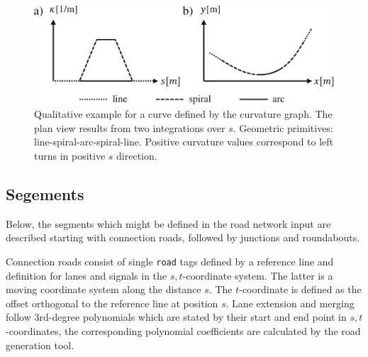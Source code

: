 \documentclass[a4paper, 10pt, conference]{ieeeconf}      %
\begin{document}
\begin{figure}%
	\centering
	\includegraphics{fig/curvGraph.pdf}
	\caption{Qualitative example for a curve defined by the curvature graph. The plan view results from two integrations over $s$. Geometric primitives: line-spiral-arc-spiral-line. Positive curvature values correspond to left turns in positive $s$ direction.}
	\label{fig_curvGraph}
\end{figure}

\subsection{Segements}\label{sec_segments}
Below, the segments which might be defined in the road network input are described starting with connection roads, followed by junctions and roundabouts.

Connection roads consist of single \texttt{road} tags defined by a reference line and definition for lanes and signals in the $s,t$-coordinate system. The latter is a moving coordinate system along the distance $s$. The $t$-coordinate is defined as the offset orthogonal to the reference line at position $s$. Lane extension and merging follow 3rd-degree polynomials which are stated by their start and end point in $s,t$-coordinates, the corresponding polynomial coefficients are calculated by the road generation tool.
\end{document}
